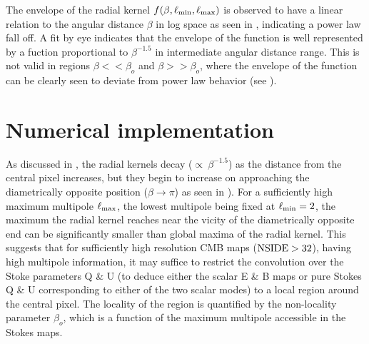 The envelope of the radial kernel $f(\beta,\ell_{\rm min},\ell_{\rm max})$ is observed to have a linear relation to the angular distance $\beta$ in log space as seen in , indicating a power law fall off. A fit by eye indicates that the envelope of the function is well represented by a fuction proportional to $\beta^{-1.5}$ in intermediate angular distance range. This is not valid in regions $\beta << \beta_o$ and $\beta >> \beta_o$, where the envelope of the function can be clearly seen to deviate from power law behavior (see ).


\section{Numerical implementation} \label{sec:numerical_implementation}

As discussed in , the radial kernels decay ($\propto ~ \beta^{-1.5}$) as the distance from the central pixel increases, but they begin to increase on approaching the diametrically opposite position ($\beta \rightarrow \pi$)  as seen in ). For a sufficiently high maximum multipole $\ell_{\rm max}$, the lowest multipole being fixed at $\ell_{\rm min}=2$, the maximum the radial kernel reaches near the vicity of the diametrically opposite end can be significantly smaller than global maxima of the radial kernel. This suggests that for sufficiently high resolution CMB maps (${\rm NSIDE} >32$), having high multipole information, it may suffice to restrict the convolution over the Stoke parameters Q \& U (to deduce either the scalar E \& B maps or pure Stokes Q \& U corresponding to either of the two scalar modes) to a local region around the central pixel. The locality of the region is quantified by the non-locality parameter $\beta_o$, which is a function of the maximum multipole accessible in the Stokes maps.

